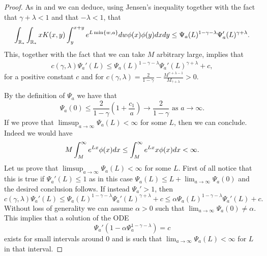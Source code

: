 \documentclass[11pt]{article}
\numberwithin{equation}{section}
\theoremstyle{plain}
\newcommand{\der}{\textup{d}}
\begin{document}
\begin{proof}
As in \cite{ferreira2021self} and \cite{fournier2006local} we can deduce, using Jensen's inequality together with the fact that $\gamma + \lambda < 1 $ and that $- \lambda < 1 $, that
\[
\int_{\mathbb R_*}  \int_{\mathbb R_*} x K(x,y) \int_{y}^{x+y}   e^{L \min\{ w, a \}} \der w \phi(x) \phi(y) \der x \der y \leq \Psi_a(L)^{1-\gamma -\lambda } \Psi_a'(L)^{\gamma +\lambda } .
\] 
This, together with the fact that we can take $M$ arbitrary large, implies that 
\begin{align}\label{horrible ODE}
c(\gamma,\lambda) \Psi_a' (L) \leq \Psi_a (L)^{1-\gamma -\lambda} \Psi_a' (L)^{\gamma+\lambda}
+ c,
\end{align}
for a positive constant $c$ and for $ c(\gamma, \lambda)= \frac{2}{1-\gamma }-\frac{M^{\gamma+\lambda-1}}{M_{\gamma + \lambda}}>0.$

By the definition of $\Psi_a$ we have that 
\[
\Psi_a(0) \leq \frac{2}{1-\gamma} \left( 1+ \frac{c_1}{a} \right) \rightarrow \frac{2}{1-\gamma} \text{ as } a \rightarrow \infty.
\]
If we prove that $ \limsup_{a \rightarrow \infty } \Psi_a(L) < \infty $ for some $L$, then we can conclude.
 Indeed we would have 
\[
M \int_M^\infty e^{Lx }  \phi(x) \der x  \leq \int_M^\infty e^{Lx } x  \phi(x) \der x  < \infty.
\] 
Let us prove that $ \limsup_{a \rightarrow \infty } \Psi_a(L) < \infty $ for some $L$.
First of all notice that this is true if $\Psi_a'(L) \leq 1 $ as in this case $\Psi_a (L) \leq L + \lim_{a \rightarrow \infty} \Psi_a(0) $ and the desired conclusion follows. 
If instead $\Psi_a' >1 $, then
\[
c(\gamma, \lambda) \Psi_a'(L) \leq \Psi_a (L)^{1-\gamma -\lambda} \Psi_a' (L)^{\gamma+\lambda}+c  \leq \alpha \Psi_a (L)^{1-\gamma -\lambda} \Psi_a' (L)+c.
\] 
Without loss of generality we can assume $\alpha >0$ such that $ \lim_{a \rightarrow \infty } \Psi_a(0) \neq \alpha$. This implies that a solution of the ODE 
\[
\Psi_a' \left( 1- \alpha  \Psi_a^{1-\gamma-\lambda} \right) =c
\] 
exists for small intervals around $0$ and is such that  $\lim_{a \rightarrow \infty } \Psi_a (L) < \infty $ for $L$ in that interval.
	\end{proof} 
\end{document}
